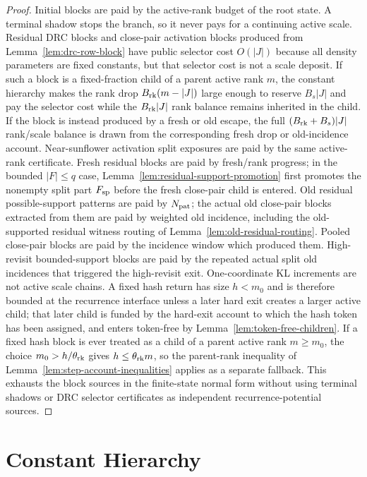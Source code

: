 \documentclass[11pt]{article}
\begin{document}
\begin{proof}
Initial blocks are paid by the active-rank budget of the root state.  A
terminal shadow stops the branch, so it never pays for a continuing active
scale.  Residual DRC blocks and close-pair activation blocks produced from
Lemma~\ref{lem:drc-row-block} have public selector cost $O(|J|)$ because all
density parameters are fixed constants, but that selector cost is not a scale
deposit.  If such a block is a fixed-fraction child of a parent active rank
$m$, the constant hierarchy makes the rank drop
$B_{\rm rk}(m-|J|)$ large enough to reserve $B_s|J|$ and pay the selector cost
while the $B_{\rm rk}|J|$ rank balance remains inherited in the child.  If the
block is instead produced by a fresh or old escape, the full
$(B_{\rm rk}+B_s)|J|$ rank/scale balance is drawn from the corresponding fresh
drop or old-incidence account.  Near-sunflower activation split exposures are paid by
the same active-rank certificate.
Fresh residual blocks are paid by fresh/rank progress; in the bounded
$|F|\le q$ case, Lemma~\ref{lem:residual-support-promotion} first promotes the
nonempty split part $F_{\rm sp}$ before the fresh close-pair child is entered.
Old residual possible-support patterns are paid by $N_{\rm pat}$; the actual
old close-pair blocks extracted from them are paid by weighted old incidence,
including the old-supported residual witness routing of
Lemma~\ref{lem:old-residual-routing}.  Pooled close-pair blocks are paid by the
incidence window which produced them.  High-revisit bounded-support blocks are
paid by the repeated actual split old incidences that triggered the
high-revisit exit.
One-coordinate KL increments are not active scale chains.  A fixed hash return
has size $h<m_0$ and is therefore bounded at the recurrence interface unless a
later hard exit creates a larger active child; that later child is funded by the
hard-exit account to which the hash token has been assigned, and enters
token-free by Lemma~\ref{lem:token-free-children}.  If a fixed hash
block is ever treated as a child of a parent active rank $m\ge m_0$, the choice
$m_0>h/\theta_{\rm rk}$ gives $h\le\theta_{\rm rk}m$, so the parent-rank
inequality of Lemma~\ref{lem:step-account-inequalities} applies as a separate
fallback.  This exhausts the block sources in the finite-state normal form
without using terminal shadows or DRC selector certificates as independent
recurrence-potential sources.
\end{proof}

\section{Constant Hierarchy}
\label{sec:constant-hierarchy}
\end{document}

